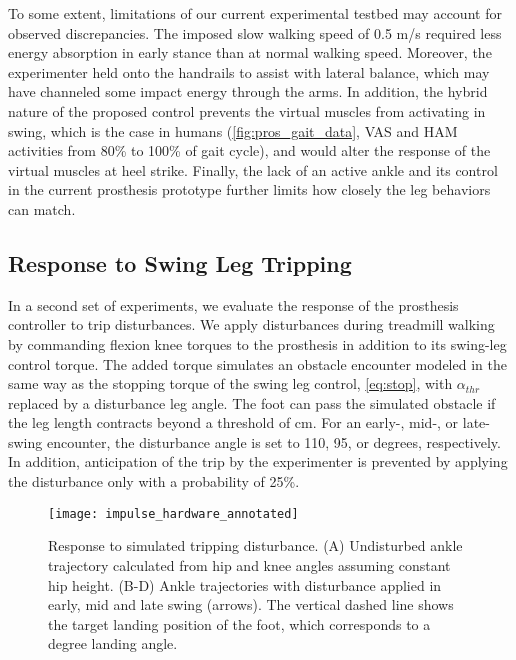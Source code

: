 To some extent, limitations of our current experimental testbed may
account for observed discrepancies. The imposed slow walking speed of 0.5 m/s
required less energy absorption in early stance than at normal walking speed.
Moreover, the experimenter held onto the handrails to assist with lateral
balance, which may have channeled some impact energy through the arms. In
addition, the hybrid nature of the proposed control prevents the virtual
muscles from activating in swing, which is the case in humans
(\cref{fig:pros_gait_data}, VAS and HAM activities from 80\% to 100\% of gait
cycle), and would alter the response of the virtual muscles at heel strike.
Finally, the lack of an active ankle and its control in the current prosthesis
prototype further limits how closely the leg behaviors can match.

\subsection{Response to Swing Leg Tripping} 

In a second set of experiments, we evaluate the response of the prosthesis
controller to trip disturbances. We apply disturbances during treadmill walking
by commanding flexion knee torques to the prosthesis in addition to its
swing-leg control torque. The added torque simulates an obstacle encounter
modeled in the same way as the stopping torque of the swing leg control,
\cref{eq:stop}, with $\alpha_{thr}$ replaced by a disturbance leg angle. The
foot can pass the simulated obstacle if the leg length contracts beyond a
threshold of \unit[94]{cm}. For an early-, mid-, or late-swing encounter, the
disturbance angle is set to 110, 95, or \unit[80]{degrees}, respectively. In
addition, anticipation of the trip by the experimenter is prevented by applying
the disturbance only with a probability of 25\%.

\begin{figure}[b!]
    \centering
    \texttt{[image: impulse\_hardware\_annotated]}
    \caption{Response to simulated tripping disturbance. (A) Undisturbed ankle
    trajectory calculated from hip and knee angles assuming constant hip height.
    (B-D) Ankle trajectories with disturbance applied in early, mid and late
    swing (arrows). The vertical dashed line shows the target landing position
    of the foot, which corresponds to a \unit[75]{degree} landing angle.}
    \label{fig:impulse_hardware}
\end{figure}

